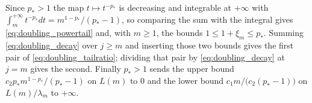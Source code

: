 Since $p_*>1$ the map $t\mapsto t^{-p_*}$ is decreasing and integrable at $+\infty$ with
$\int_m^{+\infty}t^{-p_*}dt=m^{1-p_*}/(p_*-1)$, so comparing the sum with the integral gives
\eqref{eq:doubling_powertail} and, with $m\geq1$, the bounds $1\leq1+\xi_m\leq p_*$. Summing
\eqref{eq:doubling_decay} over $j\geq m$ and inserting those two bounds gives the first pair of
\eqref{eq:doubling_tailratio}; dividing that pair by \eqref{eq:doubling_decay} at $j=m$ gives
the second. Finally $p_*>1$ sends the upper bound $c_2p_*m^{1-p_*}/(p_*-1)$ on $L(m)$ to $0$
and the lower bound $c_1m/\bigl(c_2(p_*-1)\bigr)$ on $L(m)/\lambda_m$ to $+\infty$.
